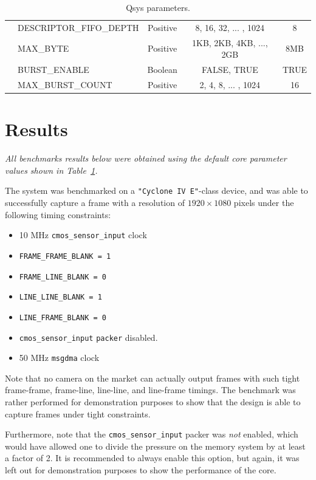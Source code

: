 \documentclass{article}
\def \cmossensorinput {\texttt{cmos\_sensor\_input} }
\def \msgdma {\texttt{msgdma} }
\begin{document}
\begin{table}[h]
{{\begin{tabular}{clccc}
                                                  & DESCRIPTOR\_FIFO\_DEPTH & Positive & 8, 16, 32, ... , 1024       & 8             \\
                                                  & MAX\_BYTE               & Positive & 1KB, 2KB, 4KB, ..., 2GB     & 8MB           \\
                                                  & BURST\_ENABLE           & Boolean  & FALSE, TRUE                 & TRUE          \\
                                                  & MAX\_BURST\_COUNT       & Positive & 2, 4, 8, ... , 1024         & 16            \\
                \bottomrule
            \end{tabular}
        }
    }
    \caption{Qsys parameters.}
    \label{tab:core_parameters}
\end{table}

\section{Results}
\emph{All benchmarks results below were obtained using the default core parameter values shown in Table~\ref{tab:core_parameters}.}

The system was benchmarked on a \texttt{"Cyclone IV E"}-class device, and was able to successfully capture a frame with a resolution of $1920 \times 1080$ pixels under the following timing constraints:

\begin{itemize}
    \itemsep-0.5em
    \item 10 MHz \cmossensorinput clock
    \item \texttt{FRAME\_FRAME\_BLANK = 1}
    \item \texttt{FRAME\_LINE\_BLANK = 0}
    \item \texttt{LINE\_LINE\_BLANK = 1}
    \item \texttt{LINE\_FRAME\_BLANK = 0}
    \item \cmossensorinput \texttt{packer} disabled.
    \item 50 MHz \msgdma clock
\end{itemize}

Note that no camera on the market can actually output frames with such tight frame-frame, frame-line, line-line, and line-frame timings.
The benchmark was rather performed for demonstration purposes to show that the design is able to capture frames under tight constraints.

Furthermore, note that the \cmossensorinput packer was \emph{not} enabled, which would have allowed one to divide the pressure on the memory system by at least a factor of 2. It is recommended to always enable this option, but again, it was left out for demonstration purposes to show the performance of the core.
\end{document}
